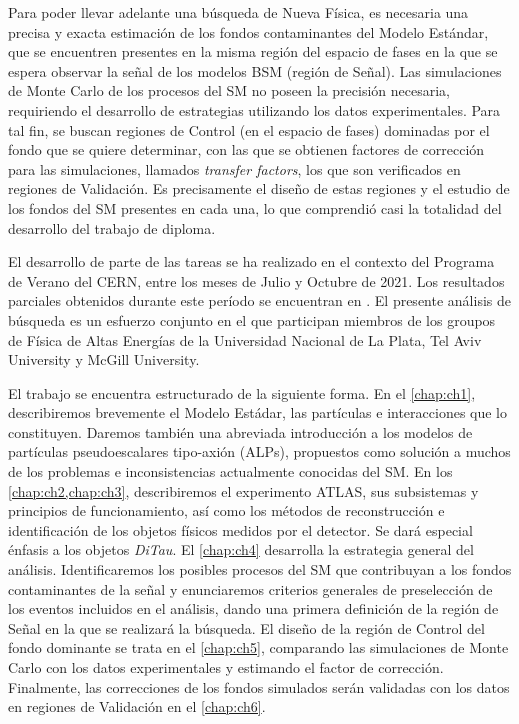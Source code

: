 Para poder llevar adelante una búsqueda de Nueva Física, es necesaria una precisa y exacta estimación de los fondos contaminantes del Modelo Estándar, que se encuentren presentes en la misma región del espacio de fases en la que se espera observar la señal de los modelos BSM (región de Señal). Las simulaciones de Monte Carlo de los procesos del SM no poseen la precisión necesaria, requiriendo el desarrollo de estrategias utilizando los datos experimentales. Para tal fin, se buscan regiones de Control (en el espacio de fases) dominadas por el fondo que se quiere determinar, con las que se obtienen factores de corrección para las simulaciones, llamados \textit{transfer factors}, los que son verificados en regiones de Validación. Es precisamente el diseño de estas regiones y el estudio de los fondos del SM presentes en cada una, lo que comprendió casi la totalidad del desarrollo del trabajo de diploma.

El desarrollo de parte de las tareas se ha realizado en el contexto del Programa de Verano del CERN, entre los meses de Julio y Octubre de 2021. Los resultados parciales obtenidos durante este período se encuentran en \cite{Beaucamp:2790493}. El presente análisis de búsqueda es un esfuerzo conjunto en el que participan miembros de los groupos de Física de Altas Energías de la Universidad Nacional de La Plata, Tel Aviv University y McGill University.

El trabajo se encuentra estructurado de la siguiente forma. En el \cref{chap:ch1}, describiremos brevemente el Modelo Estádar, las partículas e interacciones que lo constituyen. Daremos también una abreviada introducción a los modelos de partículas pseudoescalares tipo-axión (ALPs), propuestos como solución a muchos de los problemas e inconsistencias actualmente conocidas del SM. En los \cref{chap:ch2,chap:ch3}, describiremos el experimento ATLAS, sus subsistemas y principios de funcionamiento, así como los métodos de reconstrucción e identificación de los objetos físicos medidos por el detector. Se dará especial énfasis a los objetos \textit{DiTau}. El \cref{chap:ch4} desarrolla la estrategia general del análisis. Identificaremos los posibles procesos del SM que contribuyan a los fondos contaminantes de la señal y enunciaremos criterios generales de preselección de los eventos incluidos en el análisis, dando una primera definición de la región de Señal en la que se realizará la búsqueda. El diseño de la región de Control del fondo dominante se trata en el \cref{chap:ch5}, comparando las simulaciones de Monte Carlo con los datos experimentales y estimando el factor de corrección. Finalmente, las correcciones de los fondos simulados serán validadas con los datos en regiones de Validación en el \cref{chap:ch6}. 

\cleardoublepage{}